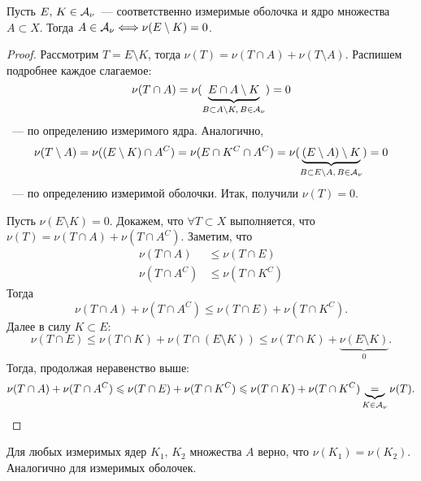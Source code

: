 \begin{claim}
    \label{lect8:cl:1}
    Пусть $E,\, K\in\mathcal{A}_{\nu}$~--- соответственно измеримые оболочка и ядро множества $A\subset X$. Тогда
    $A\in\mathcal{A}_{\nu}\Longleftrightarrow \nu(E\setminus K)=0$.

    \begin{proof}

        \circled{$\Rightarrow$} Рассмотрим $T=E\setminus K$, тогда $\nu(T)=\nu(T\cap A)+\nu(T\setminus A)$. Распишем подробнее каждое слагаемое:
        \[
            \nu(T\cap A)=\nu(\underbrace{E\cap A\setminus K}_{B\subset A\setminus K,\, B\in\mathcal{A}_{\nu}}) = 0
        \]
        ~--- по определению измеримого ядра.
        Аналогично,
        \[
            \nu(T\setminus A)=\nu((E\setminus K)\cap A^C)=\nu(E\cap K^C\cap A^C)=\nu(\underbrace{(E\setminus A)\setminus K}_{B\subset E\setminus A,\, B\in\mathcal{A}_{\nu}})=0
        \]
        ~--- по определению измеримой оболочки.
        Итак, получили $\nu(T)=0$.

        \circled{$\Leftarrow$} Пусть $\nu(E\setminus K)=0$. Докажем, что $\forall T\subset X$ выполняется, что $\nu(T)=\nu(T\cap A)+\nu(T\cap A^C)$.
        Заметим, что
        \begin{align*}
            \nu(T\cap A)   & \leqslant \nu(T\cap E)   \\
            \nu(T\cap A^C) & \leqslant \nu(T\cap K^C)
        \end{align*}
        Тогда
        \[
            \nu(T\cap A)+\nu(T\cap A^C)\leqslant \nu(T\cap E)+\nu(T\cap K^C).
        \]
        Далее в силу $K\subset E$:
        \[
            \nu(T\cap E)\leqslant\nu(T\cap K)+\nu(T\cap (E\setminus K))\leqslant\nu(T\cap K)+\underbrace{\nu(E\setminus K)}_{0}.
        \]
        Тогда, продолжая неравенство выше:
        \[
            \nu(T\cap A)+\nu(T\cap A^C)\leqslant \nu(T\cap E)+\nu(T\cap K^C)\leqslant \nu(T\cap K)+\nu(T\cap K^C) \underbrace{=}_{K\in\mathcal{A}_{\nu}} \nu(T).
        \]


    \end{proof}
\end{claim}

\begin{remark}
    Для любых измеримых ядер $K_1,\, K_2$ множества $A$ верно, что $\nu(K_1)=\nu(K_2)$. Аналогично для измеримых оболочек.
\end{remark}

